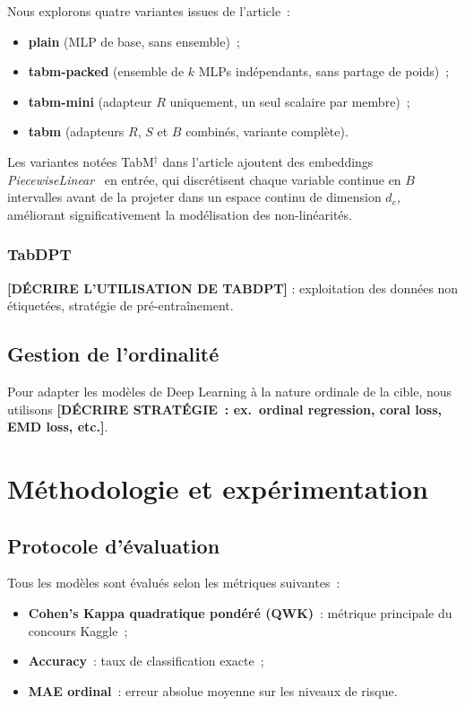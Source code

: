 \documentclass[conference]{IEEEtran}
\begin{document}
Nous explorons quatre variantes issues de l'article~:
\begin{itemize}
  \item \textbf{plain} (MLP de base, sans ensemble)~;
  \item \textbf{tabm-packed} (ensemble de $k$ MLPs indépendants, sans partage de poids)~;
  \item \textbf{tabm-mini} (adapteur $R$ uniquement, un seul scalaire par membre)~;
  \item \textbf{tabm} (adapteurs $R$, $S$ et $B$ combinés, variante complète).
\end{itemize}

Les variantes notées TabM$^\dagger$ dans l'article ajoutent des embeddings
\textit{PiecewiseLinear}~\cite{gorishniy2022embeddings} en entrée, qui discrétisent chaque
variable continue en $B$ intervalles avant de la projeter dans un espace continu de
dimension $d_e$, améliorant significativement la modélisation des non-linéarités.

\subsubsection{TabDPT}
\textbf{[DÉCRIRE L'UTILISATION DE TABDPT]} : exploitation des données non étiquetées,
stratégie de pré-entraînement.

\subsection{Gestion de l'ordinalité}

Pour adapter les modèles de Deep Learning à la nature ordinale de la cible, nous utilisons
\textbf{[DÉCRIRE STRATÉGIE~: ex.~ordinal regression, coral loss, EMD loss, etc.]}.

\section{Méthodologie et expérimentation}
\label{sec:methodo}

\subsection{Protocole d'évaluation}

Tous les modèles sont évalués selon les métriques suivantes~:
\begin{itemize}
  \item \textbf{Cohen's Kappa quadratique pondéré (QWK)}~: métrique principale du concours Kaggle~;
  \item \textbf{Accuracy}~: taux de classification exacte~;
  \item \textbf{MAE ordinal}~: erreur absolue moyenne sur les niveaux de risque.
\end{itemize}
\end{document}
